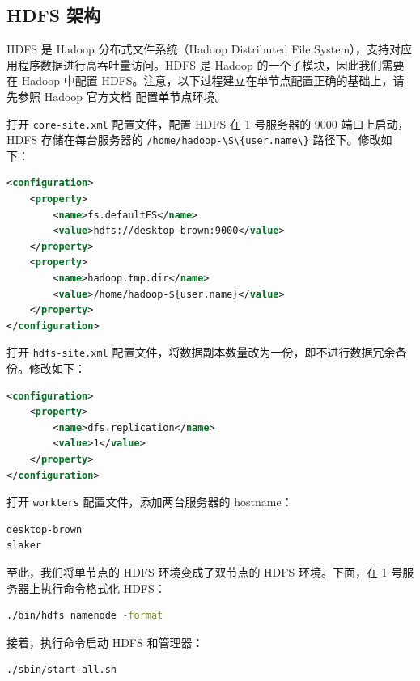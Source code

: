 \documentclass{ctexart}
\newcommand{\code}[1]{\colorbox{backcolor}{\lstinline|#1|}}
\begin{document}
    \subsection{HDFS 架构}\label{subsec:crawl}

    HDFS 是 Hadoop 分布式文件系统（Hadoop Distributed File System），支持对应用程序数据进行高吞吐量访问\cite{docs-hdfs}。HDFS 是 Hadoop 的一个子模块，因此我们需要在 Hadoop 中配置 HDFS。注意，以下过程建立在单节点配置正确的基础上，请先参照 Hadoop 官方文档\cite{docs-hadoop-single-node} 配置单节点环境。

    打开 \code{core-site.xml} 配置文件，配置 HDFS 在 1 号服务器的 9000 端口上启动，HDFS 存储在每台服务器的 \code{/home/hadoop-\$\{user.name\}} 路径下。修改如下：

    \begin{lstlisting}[language=XML]
<configuration>
    <property>
        <name>fs.defaultFS</name>
        <value>hdfs://desktop-brown:9000</value>
    </property>
    <property>
        <name>hadoop.tmp.dir</name>
        <value>/home/hadoop-${user.name}</value>
    </property>
</configuration>
    \end{lstlisting}

    打开 \code{hdfs-site.xml} 配置文件，将数据副本数量改为一份，即不进行数据冗余备份。修改如下：

    \begin{lstlisting}[language=XML]
<configuration>
    <property>
        <name>dfs.replication</name>
        <value>1</value>
    </property>
</configuration>
    \end{lstlisting}

    打开 \code{workters} 配置文件，添加两台服务器的 hostname：

    \begin{lstlisting}[language=bash]
desktop-brown
slaker
    \end{lstlisting}

    至此，我们将单节点的 HDFS 环境变成了双节点的 HDFS 环境。下面，在 1 号服务器上执行命令格式化 HDFS：

    \begin{lstlisting}[language=bash]
./bin/hdfs namenode -format
    \end{lstlisting}

    接着，执行命令启动 HDFS 和管理器：

    \begin{lstlisting}[language=bash]
./sbin/start-all.sh
    \end{lstlisting}
\end{document}
